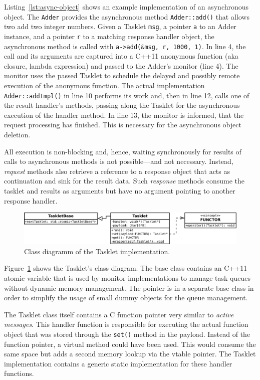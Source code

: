 Listing~\ref{lst:async-object} shows an example implementation of an asynchronous object. The \texttt{Adder} provides the asynchronous method \texttt{Adder::add()} that allows two add two integer numbers.
Given a Tasklet \texttt{msg}, a pointer \texttt{a} to an Adder instance, and a pointer \texttt{r} to a matching response handler object, the asynchronous method is called with \lstinline|a->add(&msg, r, 1000, 1)|. In line 4, the call and its arguments are captured into a C++11 anonymous function (aka closure, lambda expression) and passed to the Adder's monitor (line 4). The monitor uses the passed Tasklet to schedule the delayed and possibly remote execution of the anonymous function. The actual implementation \lstinline|Adder::addImpl()| in line 10 performs its work and, then in line 12, calls one of the result handler's methods, passing along the Tasklet for the asynchronous execution of the handler method. In line 13, the monitor is informed, that the request processing has finished. This is necessary for the asynchronous object deletion. 

All execution is non-blocking and, hence, waiting synchronously for results of calls to asynchronous methods is not possible---and not necessary. Instead, \emph{request} methods also retrieve a reference to a response object that acts as continuation and sink for the result data. Such \emph{response} methods consume the tasklet and results as arguments but have no argument pointing to another response handler.

\begin{figure}
  \centering
  \includegraphics[scale=0.25]{fig/tasklet-class.pdf}
  \caption{Class diagramm of the Tasklet implementation.}
  \label{fig:tasklet-class}
\end{figure}

Figure~\ref{fig:tasklet-class} shows the Tasklet's class diagram. The base class contains an C++11 atomic variable that is used by monitor implementations to manage task queues without dynamic memory management. The pointer is in a separate base class in order to simplify the usage of small dummy objects for the queue management. 

The Tasklet class itself contains a C function pointer very similar to \emph{active messages}. This handler function is responsible for executing the actual function object that was stored through the \lstinline|set()| method in the payload. Instead of the function pointer, a virtual method could have been used. This would consume the same space but adds a second memory lookup via the vtable pointer. The Tasklet implementation contains a generic static implementation for these handler functions.

